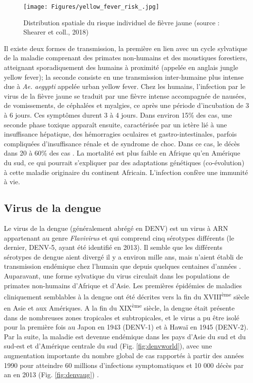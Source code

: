 \begin{figure}[t]
	\centering
	\texttt{[image: Figures/yellow\_fever\_risk\_.jpg]}
	\caption{Distribution spatiale du risque individuel de fièvre jaune (source : Shearer et coll., 2018)}
	\label{fig:yfworld}
\end{figure}

Il existe deux formes de transmission, la première en lien avec un cycle sylvatique de la maladie comprenant des primates non-humains et des moustiques forestiers, atteignant sporadiquement des humains à proximité (appelée en anglais \guillemotleft jungle yellow fever\guillemotright); la seconde consiste en une transmission inter-humaine plus intense due à {\em Ae. aegypti} appelée \guillemotleft urban yellow fever\guillemotright \cite{monath2015yellow}.
Chez les humains, l'infection par le virus de la fièvre jaune se traduit par une fièvre intense accompagnée de nausées, de vomissements, de céphalées et myalgies, ce après une période d'incubation de 3 à 6 jours.
Ces symptômes durent 3 à 4 jours.
Dans environ 15\% des cas, une seconde phase toxique apparaît ensuite, caractérisée par un ictère lié à une insuffisance hépatique, des hémorragies oculaires et gastro-intestinales, parfois compliquées d'insuffisance rénale et de syndrome de choc.
Dans ce cas, le décès dans 20 à 60\% des cas \cite{monath2015yellow}.
La mortalité est plus faible en Afrique qu'en Amérique du sud, ce qui pourrait s'expliquer par des adaptations génétiques (\guillemotleft co-évolution\guillemotright) à cette maladie originaire du continent Africain.
L'infection confère une immunité à vie.



\subsection{Virus de la dengue}
\label{sec:dengue}

Le virus de la dengue (généralement abrégé en DENV) est un virus à ARN appartenant au genre {\em Flavivirus} et qui comprend cinq sérotypes différents (le dernier, DENV-5, ayant été identifié en 2013).
Il semble que les différents sérotypes de dengue aient divergé il y a environ mille ans, mais n'aient établi de transmission endémique chez l'humain que depuis quelques centaines d'années \cite{holmes2003origin}.
Auparavant, une forme sylvatique du virus circulait dans les populations de primates non-humains d'Afrique et d'Asie.
Les premières épidémies de maladies cliniquement semblables à la dengue ont été décrites vers la fin du XVIII\textsuperscript{ème} siècle en Asie et aux Amériques.
A la fin du XIX\textsuperscript{ème} siècle, la dengue était présente dans de nombreuses zones tropicales et subtropicales, et le virus a pu être isolé pour la première fois au Japon en 1943 (DENV-1) et à Hawaï en 1945 (DENV-2).
Par la suite, la maladie est devenue endémique dans les pays d'Asie du sud et du sud-est et d'Amérique centrale du sud (Fig. \ref{fig:denvworld}), avec une augmentation importante du nombre global de cas rapportés à partir des années 1990 pour atteindre 60 millions d'infections symptomatiques et 10 000 décès par an en 2013 (Fig. \ref{fig:denvaug})  \cite{messina2014global,stanaway2016global,bhatt2013global}.

